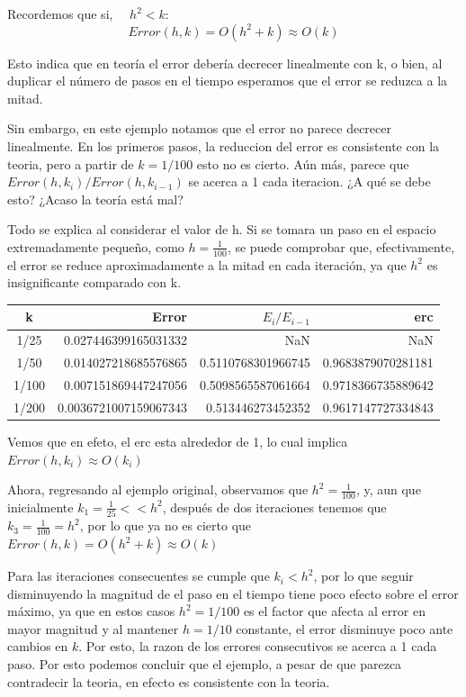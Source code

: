 \documentclass[11pt]{article}
\theoremstyle{definition}
\begin{document}
    Recordemos que si, \(\quad h^2 < k\):
\[Error(h,k)=O(h^2 + k)\approx O(k)\]

Esto indica que en teoría el error debería decrecer linealmente con k, o
bien, al duplicar el número de pasos en el tiempo esperamos que el error
se reduzca a la mitad.

Sin embargo, en este ejemplo notamos que el error no parece decrecer
linealmente. En los primeros pasos, la reduccion del error es
consistente con la teoria, pero a partir de \(k = 1/100\) esto no es
cierto. Aún más, parece que \(Error(h, k_i)/Error(h,k_{i-1})\) se acerca
a 1 cada iteracion. ¿A qué se debe esto? ¿Acaso la teoría está mal?

Todo se explica al considerar el valor de h. Si se tomara un paso en el
espacio extremadamente pequeño, como \(h=\frac{1}{100}\), se puede
comprobar que, efectivamente, el error se reduce aproximadamente a la
mitad en cada iteración, ya que \(h^2\) es insignificante comparado con
k.

\begin{center}
    \begin{tabular}{c|rrr} 
 \hline 
k & Error & $E_i/E_{i-1}$ & erc \\ \hline 
1/25 & 0.027446399165031332 & NaN & NaN \\ 
1/50 & 0.014027218685576865 & 0.5110768301966745 & 0.9683879070281181 \\ 
1/100 & 0.007151869447247056 & 0.5098565587061664 & 0.9718366735889642 \\ 
1/200 & 0.0036721007159067343 & 0.513446273452352 & 0.9617147727334843 \\ 
\hline 
 \end{tabular}
\end{center}
    

    Vemos que en efeto, el erc esta alrededor de 1, lo cual implica
\(Error(h,k_i) \approx O(k_i)\)

Ahora, regresando al ejemplo original, observamos que
\(h^2 = \frac{1}{100}\), y, aun que inicialmente
\(k_1 =\frac{1}{25} << h^2\), después de dos iteraciones tenemos que
\(k_3 = \frac{1}{100}=h^2\), por lo que ya no es cierto que
\(Error(h,k)=O(h^2 + k)\approx O(k)\)

Para las iteraciones consecuentes se cumple que \(k_i < h^2\), por lo
que seguir disminuyendo la magnitud de el paso en el tiempo tiene poco
efecto sobre el error máximo, ya que en estos casos \(h^2=1/100\) es el
factor que afecta al error en mayor magnitud y al mantener \(h=1/10\)
constante, el error disminuye poco ante cambios en \(k\). Por esto, la
razon de los errores consecutivos se acerca a 1 cada paso. Por esto
podemos concluir que el ejemplo, a pesar de que parezca contradecir la
teoria, en efecto es consistente con la teoria.

    
    
    
    
\end{document}
